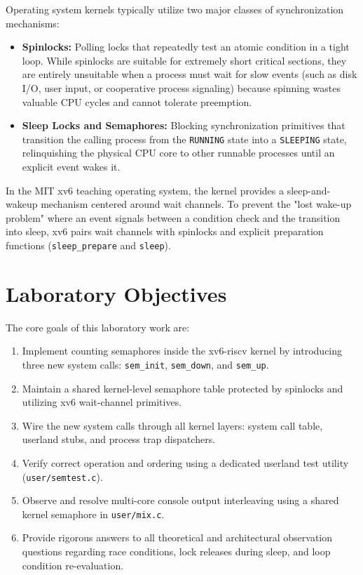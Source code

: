 \documentclass[12pt,a4paper]{report}
\numberwithin{equation}{chapter}
\numberwithin{figure}{chapter}
\numberwithin{table}{chapter}
\begin{document}
Operating system kernels typically utilize two major classes of synchronization mechanisms:
\begin{itemize}
    \item \textbf{Spinlocks:} Polling locks that repeatedly test an atomic condition in a tight loop. While spinlocks are suitable for extremely short critical sections, they are entirely unsuitable when a process must wait for slow events (such as disk I/O, user input, or cooperative process signaling) because spinning wastes valuable CPU cycles and cannot tolerate preemption.
    \item \textbf{Sleep Locks and Semaphores:} Blocking synchronization primitives that transition the calling process from the \texttt{RUNNING} state into a \texttt{SLEEPING} state, relinquishing the physical CPU core to other runnable processes until an explicit event wakes it.
\end{itemize}

In the MIT xv6 teaching operating system, the kernel provides a sleep-and-wakeup mechanism centered around wait channels. To prevent the "lost wake-up problem" where an event signals between a condition check and the transition into sleep, xv6 pairs wait channels with spinlocks and explicit preparation functions (\texttt{sleep\_prepare} and \texttt{sleep}).

\section{Laboratory Objectives}
The core goals of this laboratory work are:
\begin{enumerate}
    \item Implement counting semaphores inside the xv6-riscv kernel by introducing three new system calls: \texttt{sem\_init}, \texttt{sem\_down}, and \texttt{sem\_up}.
    \item Maintain a shared kernel-level semaphore table protected by spinlocks and utilizing xv6 wait-channel primitives.
    \item Wire the new system calls through all kernel layers: system call table, userland stubs, and process trap dispatchers.
    \item Verify correct operation and ordering using a dedicated userland test utility (\texttt{user/semtest.c}).
    \item Observe and resolve multi-core console output interleaving using a shared kernel semaphore in \texttt{user/mix.c}.
    \item Provide rigorous answers to all theoretical and architectural observation questions regarding race conditions, lock releases during sleep, and loop condition re-evaluation.
\end{enumerate}
\end{document}
